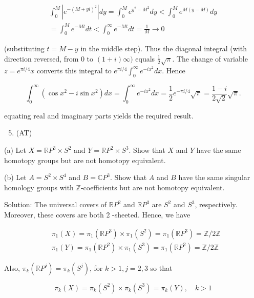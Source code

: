 \documentclass[10pt]{article}
\begin{document}
$$
\begin{gathered}
\int_{0}^{M}\left|e^{-(M+y i)^{2}}\right| d y=\int_{0}^{M} e^{y^{2}-M^{2}} d y<\int_{0}^{M} e^{M(y-M)} d y \\
=\int_{0}^{M} e^{-M t} d t<\int_{0}^{\infty} e^{-M t} d t=\frac{1}{M} \rightarrow 0
\end{gathered}
$$

(substituting $t=M-y$ in the middle step). Thus the diagonal integral (with direction reversed, from 0 to $(1+i) \infty)$ equals $\frac{1}{2} \sqrt{\pi}$. The change of variable $z=e^{\pi i / 4} x$ converts this integral to $e^{\pi i / 4} \int_{0}^{\infty} e^{-i x^{2}} d x$. Hence

$$
\int_{0}^{\infty}\left(\cos x^{2}-i \sin x^{2}\right) d x=\int_{0}^{\infty} e^{-i x^{2}} d x=\frac{1}{2} e^{-\pi i / 4} \sqrt{\pi}=\frac{1-i}{2 \sqrt{2}} \sqrt{\pi} .
$$

equating real and imaginary parts yields the required result.

\begin{enumerate}
  \setcounter{enumi}{4}
  \item (AT)
\end{enumerate}

(a) Let $X=\mathbb{R} P^{3} \times S^{2}$ and $Y=\mathbb{R} P^{2} \times S^{3}$. Show that $X$ and $Y$ have the same homotopy groups but are not homotopy equivalent.

(b) Let $A=S^{2} \times S^{4}$ and $B=\mathbb{C} P^{3}$. Show that $A$ and $B$ have the same singular homology groups with $\mathbb{Z}$-coefficients but are not homotopy equivalent.

Solution: The universal covers of $\mathbb{R} P^{2}$ and $\mathbb{R} P^{3}$ are $S^{2}$ and $S^{3}$, respectively. Moreover, these covers are both 2 -sheeted. Hence, we have

$$
\begin{aligned}
& \pi_{1}(X)=\pi_{1}\left(\mathbb{R} P^{3}\right) \times \pi_{1}\left(S^{2}\right)=\pi_{1}\left(\mathbb{R} P^{3}\right)=\mathbb{Z} / 2 \mathbb{Z} \\
& \pi_{1}(Y)=\pi_{1}\left(\mathbb{R} P^{2}\right) \times \pi_{1}\left(S^{3}\right)=\pi_{1}\left(\mathbb{R} P^{2}\right)=\mathbb{Z} / 2 \mathbb{Z}
\end{aligned}
$$

Also, $\pi_{k}\left(\mathbb{R} P^{j}\right)=\pi_{k}\left(S^{j}\right)$, for $k>1, j=2,3$ so that

$$
\pi_{k}(X)=\pi_{k}\left(S^{2}\right) \times \pi_{k}\left(S^{3}\right)=\pi_{k}(Y), \quad k>1
$$
\end{document}
